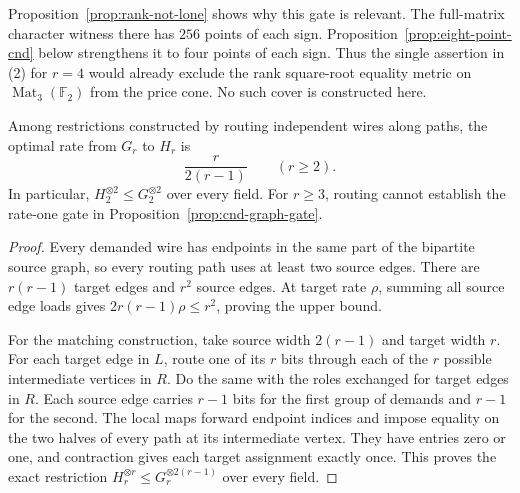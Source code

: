 Proposition~\ref{prop:rank-not-lone} shows why this gate is relevant.
The full-matrix character witness there has $256$ points of each
sign.  Proposition~\ref{prop:eight-point-cnd} below strengthens it
to four points of each sign.  Thus the single assertion in (2)
for $r=4$ would already exclude the rank square-root equality
metric on $\operatorname{Mat}_3(\mathbb F_2)$ from the price cone.
No such cover is constructed here.

\begin{proposition}
\label{prop:cnd-routing}
Among restrictions constructed by routing independent wires along
paths, the optimal rate from $G_r$ to $H_r$ is
\[
 \frac{r}{2(r-1)}\qquad(r\ge2).
\]
In particular, $H_2^{\otimes2}\le G_2^{\otimes2}$ over every field.
For $r\ge3$, routing cannot establish the rate-one gate in
Proposition~\ref{prop:cnd-graph-gate}.
\end{proposition}
\begin{proof}
Every demanded wire has endpoints in the same part of the bipartite
source graph, so every routing path uses at least two source edges.
There are $r(r-1)$ target edges and $r^2$ source edges.  At target
rate $\rho$, summing all source edge loads gives
$2r(r-1)\rho\le r^2$, proving the upper bound.

For the matching construction, take source width $2(r-1)$ and
target width $r$.  For each target edge in $L$, route one of its
$r$ bits through each of the $r$ possible intermediate vertices
in $R$.  Do the same with the roles exchanged for target edges
in $R$.  Each source edge carries $r-1$ bits for the first group
of demands and $r-1$ for the second.  The local maps forward
endpoint indices and impose equality on the two halves of every
path at its intermediate vertex.  They have entries zero or one,
and contraction gives each target assignment exactly once.
This proves the exact restriction
$H_r^{\otimes r}\le G_r^{\otimes 2(r-1)}$ over every field.
\end{proof}

